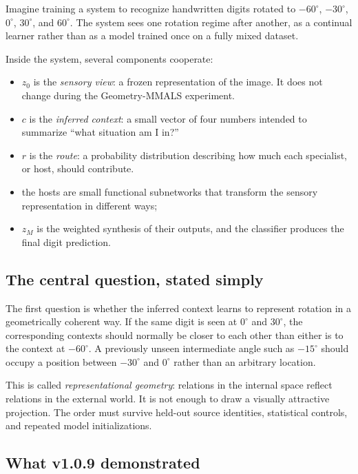 \documentclass[11pt,a4paper]{article}
\begin{document}
\begin{plainbox}
Imagine training a system to recognize handwritten digits rotated to $-60^\circ$, $-30^\circ$, $0^\circ$, $30^\circ$, and $60^\circ$. The system sees one rotation regime after another, as a continual learner rather than as a model trained once on a fully mixed dataset.

Inside the system, several components cooperate:
\begin{itemize}
\item $z_0$ is the \emph{sensory view}: a frozen representation of the image. It does not change during the Geometry-MMALS experiment.
\item $c$ is the \emph{inferred context}: a small vector of four numbers intended to summarize ``what situation am I in?''
\item $r$ is the \emph{route}: a probability distribution describing how much each specialist, or host, should contribute.
\item the hosts are small functional subnetworks that transform the sensory representation in different ways;
\item $z_M$ is the weighted synthesis of their outputs, and the classifier produces the final digit prediction.
\end{itemize}
\end{plainbox}

\subsection{The central question, stated simply}

The first question is whether the inferred context learns to represent rotation in a geometrically coherent way. If the same digit is seen at $0^\circ$ and $30^\circ$, the corresponding contexts should normally be closer to each other than either is to the context at $-60^\circ$. A previously unseen intermediate angle such as $-15^\circ$ should occupy a position between $-30^\circ$ and $0^\circ$ rather than an arbitrary location.

This is called \emph{representational geometry}: relations in the internal space reflect relations in the external world. It is not enough to draw a visually attractive projection. The order must survive held-out source identities, statistical controls, and repeated model initializations.

\subsection{What v1.0.9 demonstrated}
\end{document}
